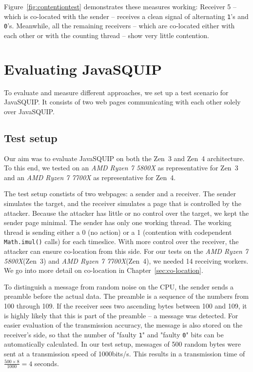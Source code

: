 \documentclass[11pt,
  titlepage=false,
]{scrreprt}
\begin{document}
Figure~\ref{fig:contentiontest} demonstrates these measures working:
Receiver 5 -- which is co-located with the sender -- receives a clean signal of alternating \texttt{1}'s and \texttt{0}'s.
Meanwhile, all the remaining receivers -- which are co-located either with each other or with the counting thread -- show very little contention.

\pagebreak
\chapter{Evaluating JavaSQUIP}
\label{ch:evaluation}

To evaluate and measure different approaches, we set up a test scenario for JavaSQUIP.
It consists of two web pages communicating with each other solely over JavaSQUIP.

\section {Test setup}
\label{sec:testsetup}
Our aim was to evaluate JavaSQUIP on both the Zen~3 and Zen~4 architecture.
To this end, we tested on an \textit{AMD Ryzen 7 5800X} as representative for Zen~3 and an \textit{AMD Ryzen 7 7700X} as representative for Zen~4.

The test setup constists of two webpages: a sender and a receiver.
The sender simulates the target, and the receiver simulates a page that is controlled by the attacker.
Because the attacker has little or no control over the target, we kept the sender page minimal.
The sender has only one working thread.
The working thread is sending either a 0 (no action) or a 1 (contention with codependent \texttt{Math.imul()} calls) for each timeslice.
With more control over the receiver, the attacker can ensure co-location from this side.
For our tests on the \textit{AMD Ryzen 7 5800X}(Zen~3) and \textit{AMD Ryzen 7 7700X}(Zen~4), we needed 14 receiving workers.
We go into more detail on co-location in Chapter~\ref{sec:co-location}.

To distinguish a message from random noise on the CPU, the sender sends a preamble before the actual data.
The preamble is a sequence of the numbers from 100 through 109.
If the receiver sees two ascending bytes between 100 and 109, it is highly likely that this is part of the preamble --
a message was detected.
For easier evaluation of the transmission accuracy, the message is also stored on the receiver's side,
so that the number of "faulty \texttt{1}" and "faulty \texttt{0}" bits can be automatically calculated.
In our test setup, messages of 500 random bytes were sent at a transmission speed of 1000bits/s.
This results in a transmission time of $\frac{500 \times 8}{1000} = 4$ seconds.
\end{document}
